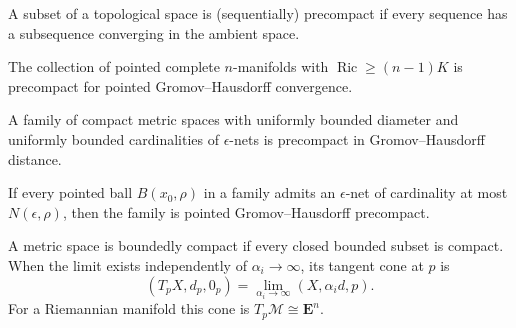 \begin{definition}[Precompactness]
\label{def:chow-iii-g16-precompactness}
A subset of a topological space is (sequentially) precompact if every sequence
has a subsequence converging in the ambient space.
\end{definition}

\begin{theorem}
\label{thm:chow-iii-g17-gromov-precompactness}
The collection of pointed complete $n$-manifolds with
$\operatorname{Ric}\ge(n-1)K$ is precompact for pointed
Gromov--Hausdorff convergence.
\end{theorem}

\begin{theorem}
\label{thm:chow-iii-g18-total-boundedness}
A family of compact metric spaces with uniformly bounded diameter and uniformly
bounded cardinalities of $\epsilon$-nets is precompact in Gromov--Hausdorff
distance.
\end{theorem}

\begin{theorem}
\label{thm:chow-iii-g19-pointed-total-boundedness}
If every pointed ball $B(x_0,\rho)$ in a family admits an $\epsilon$-net of
cardinality at most $N(\epsilon,\rho)$, then the family is pointed
Gromov--Hausdorff precompact.
\end{theorem}

\begin{definition}
\label{def:chow-iii-g20-tangent-cone}
A metric space is boundedly compact if every closed bounded subset is compact.
When the limit exists independently of $\alpha_i\to\infty$, its tangent cone at
$p$ is
\[
(T_pX,d_p,0_p)=\lim_{\alpha_i\to\infty}(X,\alpha_i d,p).
\]
For a Riemannian manifold this cone is $T_p\mathcal M\cong\mathbf E^n$.
\end{definition}

